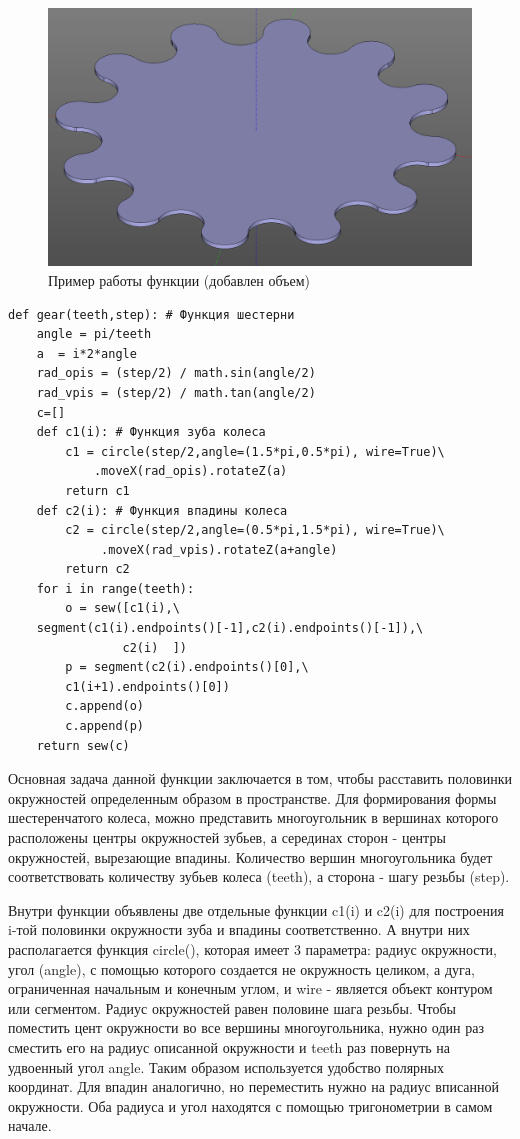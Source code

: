 \begin{figure}[h]
\centering
\includegraphics[width=0.65\linewidth]{./image/gear}
\caption{Пример работы функции (добавлен объем)}
\end{figure} 

\begin{lstlisting}[style=python,caption=Работа с линиями объединение]
def gear(teeth,step): # Функция шестерни
    angle = pi/teeth
    a  = i*2*angle
    rad_opis = (step/2) / math.sin(angle/2)
    rad_vpis = (step/2) / math.tan(angle/2)
    c=[]
    def c1(i): # Функция зуба колеса
        c1 = circle(step/2,angle=(1.5*pi,0.5*pi), wire=True)\
            .moveX(rad_opis).rotateZ(a)
        return c1
    def c2(i): # Функция впадины колеса
        c2 = circle(step/2,angle=(0.5*pi,1.5*pi), wire=True)\
             .moveX(rad_vpis).rotateZ(a+angle)
        return c2
    for i in range(teeth):
        o = sew([c1(i),\
    segment(c1(i).endpoints()[-1],c2(i).endpoints()[-1]),\
                c2(i)  ])
        p = segment(c2(i).endpoints()[0],\
        c1(i+1).endpoints()[0])
        c.append(o)
        c.append(p)
    return sew(c)
\end{lstlisting}

Основная задача данной функции заключается в том, чтобы расставить половинки окружностей определенным образом в пространстве. Для формирования формы шестеренчатого колеса, можно представить многоугольник в вершинах которого расположены центры окружностей зубьев, а серединах сторон - центры окружностей, вырезающие впадины. Количество вершин многоугольника будет соответствовать количеству зубьев колеса (teeth), а сторона - шагу резьбы (step). 

Внутри функции объявлены две отдельные функции c1(i) и c2(i) для построения i-той половинки окружности зуба и впадины соответственно. А внутри них располагается функция circle(), которая имеет 3 параметра: радиус окружности, угол (angle), с помощью которого создается не окружность целиком, а дуга, ограниченная начальным и конечным углом, и wire - является объект контуром или сегментом. Радиус окружностей равен половине шага резьбы. Чтобы поместить цент окружности во все вершины многоугольника, нужно один раз сместить его на радиус описанной окружности и teeth раз повернуть на удвоенный угол angle. Таким образом используется удобство полярных координат. Для впадин аналогично, но переместить нужно на радиус вписанной окружности. Оба радиуса и угол находятся с помощью тригонометрии в самом начале.

